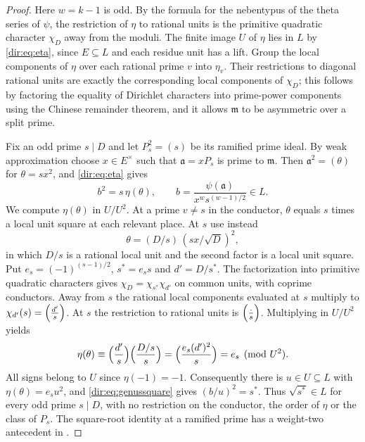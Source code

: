 \begin{proof}
Here $w=k-1$ is odd. By the formula for the nebentypus of the theta series of $\psi$,
the restriction of $\eta$ to rational units is the primitive quadratic character
$\chi_D$ away from the moduli. The finite image $U$ of $\eta$ lies in $L$ by
\eqref{dir:eq:eta}, since $E\subseteq L$ and each residue unit has a lift. Group the
local components of $\eta$ over each rational prime $v$ into $\eta_v$. Their
restrictions to diagonal rational units are exactly the corresponding local components
of $\chi_D$; this follows by factoring the equality of Dirichlet characters into
prime-power components using the Chinese remainder theorem, and it allows $\mathfrak m$
to be asymmetric over a split prime.

Fix an odd prime $s\mid D$ and let $P_s^2=(s)$ be its ramified prime ideal. By weak
approximation choose $x\in E^\times$ such that $\mathfrak a=xP_s$ is prime to
$\mathfrak m$. Then $\mathfrak a^2=(\theta)$ for $\theta=sx^2$, and \eqref{dir:eq:eta}
gives
\begin{equation}\label{dir:eq:genussquare}
 b^2=s\,\eta(\theta),\qquad b=\frac{\psi(\mathfrak a)}{x^ws^{(w-1)/2}}\in L .
\end{equation}
We compute $\eta(\theta)$ in $U/U^2$. At a prime $v\ne s$ in the conductor, $\theta$
equals $s$ times a local unit square at each relevant place. At $s$ use instead
\[
 \theta=(D/s)\,(sx/\sqrt D)^2 ,
\]
in which $D/s$ is a rational local unit and the second factor is a local unit square.
Put $e_s=(-1)^{(s-1)/2}$, $s^*=e_ss$ and $d'=D/s^*$. The factorization into primitive
quadratic characters gives $\chi_D=\chi_{s^*}\chi_{d'}$ on common units, with coprime
conductors. Away from $s$ the rational local components evaluated at $s$ multiply to
$\chi_{d'}(s)=\Bigl(\frac{d'}{s}\Bigr)$. At $s$ the restriction to rational units is
$\Bigl(\frac{\cdot}{s}\Bigr)$. Multiplying in $U/U^2$ yields
\[
 \eta(\theta)\equiv\Bigl(\frac{d'}{s}\Bigr)\Bigl(\frac{D/s}{s}\Bigr)
 =\Bigl(\frac{e_s(d')^2}{s}\Bigr)=e_s\pmod{U^2}.
\]
All signs belong to $U$ since $\eta(-1)=-1$. Consequently there is $u\in U\subseteq L$
with $\eta(\theta)=e_su^2$, and \eqref{dir:eq:genussquare} gives $(b/u)^2=s^*$. Thus
$\sqrt{s^*}\in L$ for every odd prime $s\mid D$, with no restriction on the conductor,
the order of $\eta$ or the class of $P_s$. The square-root identity at a ramified prime
has a weight-two antecedent in \cite[Lemma~3.3]{Yang2003CM}.


\end{proof}
